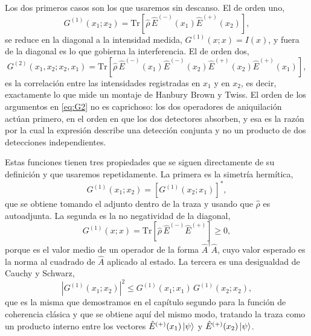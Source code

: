     Los dos primeros casos son los que usaremos sin descanso. El de orden uno,
    \begin{equation}\label{eq:G1}
        G^{(1)}(x_{1};x_{2}) = \mathrm{Tr}\left[\hat{\rho}\,\hat{E}^{(-)}(x_{1})\hat{E}^{(+)}(x_{2})\right],
    \end{equation}
    se reduce en la diagonal a la intensidad medida, $G^{(1)}(x;x) = I(x)$, y fuera de la diagonal es lo que gobierna la interferencia. El de orden dos,
    \begin{equation}\label{eq:G2}
        G^{(2)}(x_{1},x_{2};x_{2},x_{1}) = \mathrm{Tr}\left[\hat{\rho}\,\hat{E}^{(-)}(x_{1})\hat{E}^{(-)}(x_{2})\hat{E}^{(+)}(x_{2})\hat{E}^{(+)}(x_{1})\right],
    \end{equation}
    es la correlación entre las intensidades registradas en $x_{1}$ y en $x_{2}$, es decir, exactamente lo que mide un montaje de Hanbury Brown y Twiss. El orden de los argumentos en \eqref{eq:G2} no es caprichoso: los dos operadores de aniquilación actúan primero, en el orden en que los dos detectores absorben, y esa es la razón por la cual la expresión describe una detección conjunta y no un producto de dos detecciones independientes.

    Estas funciones tienen tres propiedades que se siguen directamente de su definición y que usaremos repetidamente. La primera es la simetría hermítica,
    \begin{equation}\label{eq:G1Hermitica}
        G^{(1)}(x_{1};x_{2}) = \left[G^{(1)}(x_{2};x_{1})\right]^{*},
    \end{equation}
    que se obtiene tomando el adjunto dentro de la traza y usando que $\hat{\rho}$ es autoadjunta. La segunda es la no negatividad de la diagonal,
    \begin{equation}\label{eq:G1Positiva}
        G^{(1)}(x;x) = \mathrm{Tr}\left[\hat{\rho}\,\hat{E}^{(-)}\hat{E}^{(+)}\right] \geq 0,
    \end{equation}
    porque es el valor medio de un operador de la forma $\hat{A}^{\dagger}\hat{A}$, cuyo valor esperado es la norma al cuadrado de $\hat{A}$ aplicado al estado. La tercera es una desigualdad de Cauchy y Schwarz,
    \begin{equation}\label{eq:CauchySchwarzG1}
        \left|G^{(1)}(x_{1};x_{2})\right|^{2} \leq G^{(1)}(x_{1};x_{1})\,G^{(1)}(x_{2};x_{2}),
    \end{equation}
    que es la misma que demostramos en el capítulo segundo para la función de coherencia clásica y que se obtiene aquí del mismo modo, tratando la traza como un producto interno entre los vectores $\hat{E}^{(+)}(x_{1})\ket{\psi}$ y $\hat{E}^{(+)}(x_{2})\ket{\psi}$.

